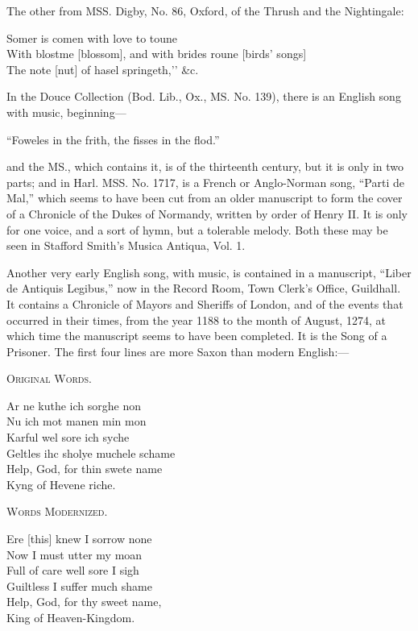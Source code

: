 The other from MSS. Digby, No. 86, Oxford, of the Thrush and the Nightingale:

\settowidth{\versewidth}{With blostme [blossom], and with brides roune [birds’ songs]}

\begin{scverse}
\begin{patverse}
Somer is comen with love to toune\\
With blostme [blossom], and with brides roune [birds’ songs]\\
The note [nut] of hasel springeth,’' \&c.
\end{patverse}
\end{scverse}

In the Douce Collection (Bod. Lib., Ox., MS. No. 139), there is an English
song with music, beginning—
\settowidth{\versewidth}{Foweles in the frith, the fisses in the flod.}
\begin{scverse}
“Foweles in the frith, the fisses in the flod.”
\end{scverse}
and the MS., which contains it, is of the thirteenth century, but it is only in
two parts; and in Harl. MSS. No. 1717, is a French or Anglo-Norman song,
“Parti de Mal,” which seems to have been cut from an older manuscript to form
the cover of a Chronicle of the Dukes of Normandy, written by order of Henry II.
It is only for one voice, and a sort of hymn, but a tolerable melody. Both these
may be seen in Stafford Smith’s Musica Antiqua, Vol. 1.

Another very early English song, with music, is contained in a manu\-script,
“Liber de Antiquis Legibus,” now in the Record Room, Town Clerk’s Office,
Guildhall. It contains a Chronicle of Mayors and Sheriffs of London, and of the
events that occurred in their times, from the year 1188 to the month of August,
1274, at which time the manuscript seems to have been completed. It is the
Song of a Prisoner. The first four lines are more Saxon than modern English:—

\settowidth{\versewidth}{Geltles ihc sholye muchele schame}
\begin{dcverse}
\vin\vin\textsc{Original Words.}

Ar ne kuthe ich sorghe non\\
Nu ich mot manen min mon\\
Karful wel sore ich syche\\
Geltles ihc sholye muchele schame\\
Help, God, for thin swete name\\
\vin Kyng of Hevene riche.

\vin\vin\textsc{Words Modernized.}

Ere [this] knew I sorrow none\\
Now I must utter my moan\\
Full of care well sore I sigh\\
Guiltless I suffer much shame\\
Help, God, for thy sweet name,\\
\vin King of Heaven-Kingdom. \\
\end{dcverse}

\pagebreak

